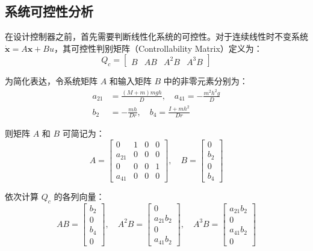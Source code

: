 \documentclass[
  oneside,
  degree=bachelor,
  fullwidthstop=false,
  fontset=fandol,
  times=false,
  minted=true,
  biblatex=true,
]{tongjithesis}
\begin{document}
\subsection{系统可控性分析}

在设计控制器之前，首先需要判断线性化系统的可控性。对于连续线性时不变系统 $\dot{\mathbf{x}} = A\mathbf{x} + Bu$，其可控性判别矩阵（Controllability Matrix）定义为：
\begin{equation}
Q_c = \begin{bmatrix} B & AB & A^2B & A^3B \end{bmatrix}
\end{equation}

为简化表达，令系统矩阵 $A$ 和输入矩阵 $B$ 中的非零元素分别为：
\begin{equation}
\begin{aligned}
a_{21} &= \frac{(M+m)mgh}{D}, \quad a_{41} = -\frac{m^2h^2g}{D} \\
b_2 &= -\frac{mh}{Dr}, \quad b_4 = \frac{I+mh^2}{Dr}
\end{aligned}
\end{equation}

则矩阵 $A$ 和 $B$ 可简记为：
\begin{equation}
A = \begin{bmatrix} 0 & 1 & 0 & 0 \\ a_{21} & 0 & 0 & 0 \\ 0 & 0 & 0 & 1 \\ a_{41} & 0 & 0 & 0 \end{bmatrix}, \quad B = \begin{bmatrix} 0 \\ b_2 \\ 0 \\ b_4 \end{bmatrix}
\end{equation}

依次计算 $Q_c$ 的各列向量：
\begin{equation}
AB = \begin{bmatrix} b_2 \\ 0 \\ b_4 \\ 0 \end{bmatrix}, \quad A^2B = \begin{bmatrix} 0 \\ a_{21}b_2 \\ 0 \\ a_{41}b_2 \end{bmatrix}, \quad A^3B = \begin{bmatrix} a_{21}b_2 \\ 0 \\ a_{41}b_2 \\ 0 \end{bmatrix}
\end{equation}
\end{document}
